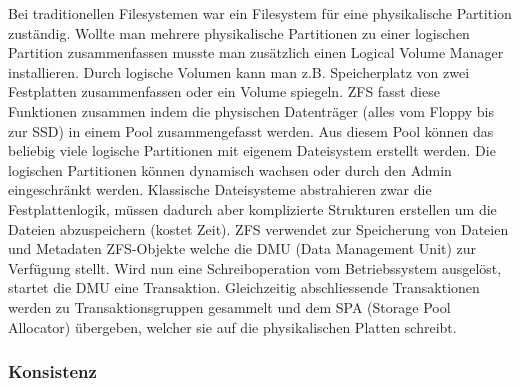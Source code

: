 Bei traditionellen Filesystemen war ein Filesystem für eine physikalische Partition zuständig. Wollte man mehrere physikalische Partitionen zu einer logischen Partition zusammenfassen musste man zusätzlich einen Logical Volume Manager installieren. Durch logische Volumen kann man z.B. Speicherplatz von zwei Festplatten zusammenfassen oder ein Volume spiegeln.
ZFS fasst diese Funktionen zusammen indem die physischen Datenträger (alles vom Floppy bis zur SSD) in einem Pool zusammengefasst werden. Aus diesem Pool können das beliebig viele logische Partitionen mit eigenem Dateisystem erstellt werden. Die logischen Partitionen können dynamisch wachsen oder durch den Admin eingeschränkt werden.
Klassische Dateisysteme abstrahieren zwar die Festplattenlogik, müssen dadurch aber komplizierte Strukturen erstellen um die Dateien abzuspeichern (kostet Zeit). ZFS verwendet zur Speicherung von Dateien und Metadaten ZFS-Objekte welche die DMU (Data Management Unit) zur Verfügung stellt. Wird nun eine Schreiboperation vom Betriebssystem ausgelöst, startet die DMU eine Transaktion. Gleichzeitig abschliessende Transaktionen werden zu Transaktionsgruppen gesammelt und dem SPA (Storage Pool Allocator) übergeben, welcher sie auf die physikalischen Platten schreibt.

\subsubsection{Konsistenz}

